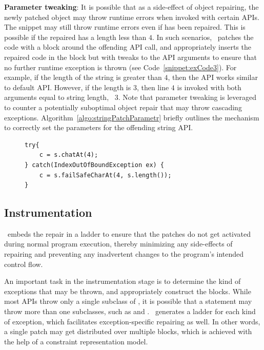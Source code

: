 \begin{mylist}
 \item \textbf{Parameter tweaking}: It is possible that as a side-effect of
object repairing, the newly patched object may throw runtime errors when invoked
with certain  APIs. The snippet  may still
throw runtime errors even if  has been repaired. This is possible if the
repaired  has a length less than $4$. In such scenarios, \tool\ patches
the code with a  block around the offending API call, and
appropriately inserts the repaired code in the  block but with
tweaks to the API arguments to ensure that no further runtime exception is
thrown (see Code~\ref{snippet:exCode3}). For example, if the length of the
string is greater than $4$, then the API works similar to default 
API. However, if the length is $3$, then line $4$ is invoked with both arguments
equal to string length, \ie\ $3$. Note that parameter tweaking is leveraged to
counter a potentially suboptimal object repair that may throw cascading
exceptions. Algorithm~\ref{algo:stringPatchParametr} briefly outlines the
mechanism to correctly set the parameters for the offending string API.

\lstset{language=Java, caption=Example of parameter tweaking.,
label = snippet:exCode3, firstnumber =1}
\begin{figure}[t]
\begin{lstlisting}
try{
    c = s.chatAt(4);
} catch(IndexOutOfBoundException ex) {
    c = s.failSafeCharAt(4, s.length());
}
\end{lstlisting}
\end{figure}
\end{mylist}

\vspace{-0.1cm} 
\subsection{Instrumentation}
\label{sec:tool:stage3}

\tool\ embeds the repair in a  ladder to ensure that the patches
do not get activated during normal program execution, thereby minimizing any
side-effects of repairing and preventing any inadvertent changes to the
program's intended control flow.

An important task in the instrumentation stage is to determine the kind of
exceptions that may be thrown, and appropriately construct the 
blocks. While most APIs throw only a single subclass of ,
it is possible that a statement may throw more than one subclasses, such as
 and . \tool\
generates a  ladder for each kind of exception, which facilitates
exception-specific repairing as well. In other words, a single patch
may get distributed over multiple \code{catch} blocks, which is achieved with
the help of a constraint representation model.



